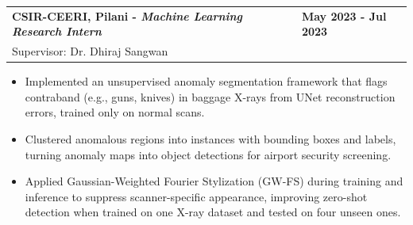 \documentclass[letterpaper,11pt]{article}
\begin{document}
\vspace{0.6em}

\begin{tabularx}{\linewidth}{ @{}l X@{} }
\textbf{CSIR-CEERI, Pilani - \textit{Machine Learning Research Intern}} & \hfill \textbf{May 2023 - Jul 2023} \\
Supervisor: Dr. Dhiraj Sangwan
\end{tabularx}
\vspace{-1.2em}

\begin{itemize}
    \item[--] Implemented an unsupervised anomaly segmentation framework that flags contraband (e.g., guns, knives) in baggage X-rays from UNet reconstruction errors, trained only on normal scans.\vspace{-0.5em}
    \item[--] Clustered anomalous regions into instances with bounding boxes and labels, turning anomaly maps into object detections for airport security screening.\vspace{-0.5em}
    \item[--] Applied Gaussian-Weighted Fourier Stylization (GW-FS) during training and inference to suppress scanner-specific appearance, improving zero-shot detection when trained on one X-ray dataset and tested on four unseen ones.
\end{itemize}

\end{document}
